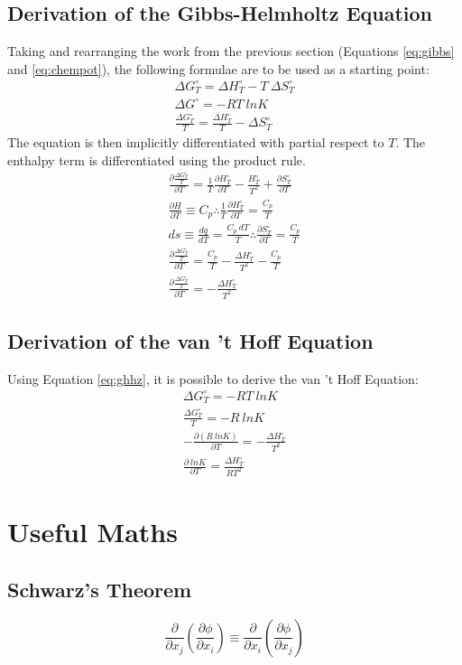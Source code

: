 \documentclass[10pt, oneside, twocolumn]{article}
\numberwithin{equation}{section}
\begin{document}
		\subsection{Derivation of the Gibbs-Helmholtz Equation}
		Taking and rearranging the work from the previous section (Equations \ref{eq:gibbs} and \ref{eq:chempot}), the following formulae are to be used as a starting point:
		\begin{gather}
		\Delta G^\circ_T=\Delta H^\circ_T-T \ \Delta S^\circ_T\\
		\Delta G^\circ=-RT \ lnK\\
		\frac{\Delta G^\circ_T}{T}=\frac{\Delta H^\circ_T}{T}-\Delta S^\circ_T
		\end{gather}
		The equation is then implicitly differentiated with partial respect to $T$. The enthalpy term is differentiated using the product rule.
		\begin{gather}
		\frac{\partial \frac{\Delta G^\circ_T}{T}}{\partial T}=\frac{1}{T}\frac{\partial H^\circ_T}{\partial T}-\frac{H^\circ_T}{T^2}+\frac{\partial S^\circ_T}{\partial T}\\
		\frac{\partial H}{\partial T}\equiv C_p\therefore \frac{1}{T}\frac{\partial H^\circ_T}{\partial T}=\frac{C_p}{T}\\
		ds\equiv\frac{dq}{dT}=\frac{C_p \ dT}{T}\therefore\frac{\partial S^\circ_T}{\partial T}=\frac{C_p}{T}\\
		\frac{\partial \frac{\Delta G^\circ_T}{T}}{\partial T}=\frac{C_p}{T}-\frac{\Delta H^\circ_T}{T^2}-\frac{C_p}{T}\\
		\frac{\partial \frac{\Delta G^\circ_T}{T}}{\partial T}=-\frac{\Delta H^\circ_T}{T^2} \label{eq:ghhz}                                                                  
		\end{gather}
		\subsection{Derivation of the van 't Hoff Equation}
		Using Equation \ref{eq:ghhz}, it is possible to derive the van 't Hoff Equation:
			\begin{gather}
			\Delta G^\circ_T=-RT \ lnK\\
			\frac{\Delta G^\circ_T}{T}=-R \ lnK\\
			-\frac{\partial (R \ lnK)}{\partial T}=-\frac{\Delta H^\circ_T}{T^2}\\
			\frac{\partial \ lnK}{\partial T}=\frac{\Delta H^\circ_T}{RT^2}
			\end{gather}
	\section{Useful Maths}
		\subsection{Schwarz's Theorem}
			\begin{equation}
			\frac{\partial}{\partial x_j}{\left(\frac{\partial \phi}{\partial x_i}\right)}\equiv\frac{\partial}{\partial x_i}{\left(\frac{\partial \phi}{\partial x_j}\right)}
			\end{equation}
\end{document}
